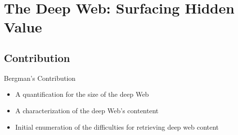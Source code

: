 \documentclass{beamer}
\begin{document}
\section{The Deep Web: Surfacing Hidden Value}
\subsection{Contribution}
\begin{frame}{Bergman's Contribution}
\begin{block}{}
			\begin{itemize}
     			  \item A quantification for the size of the deep Web
   				 \item A characterization of the deep Web's contentent
   	\item Initial enumeration of the difficulties for retrieving deep web content 
  			\end{itemize}
\end{block}
\end{frame}
\end{document}
